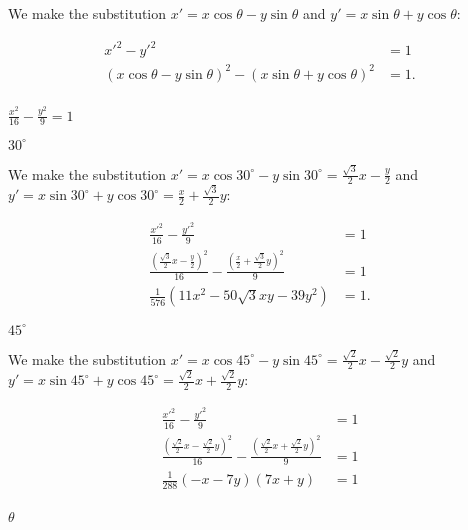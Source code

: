 \documentclass[../gatm_answers.tex]{subfiles}
\begin{document}
We make the substitution $x'=x \cos \theta - y\sin \theta$ and $y'=x\sin \theta + y\cos \theta$:

\begin{align*}
x'^2-y'^2&=1 \\
(x \cos \theta - y\sin \theta)^2 - (x\sin \theta + y\cos \theta)^2 &= 1. \\
\end{align*}

\begin{inner_problem}
\item $\frac{x^2}{16}-\frac{y^2}{9}=1$
\end{inner_problem}

\begin{iinner_problem}[start=1]
\item $30^\circ$
\end{iinner_problem}

We make the substitution $x'=x \cos 30^\circ - y\sin 30^\circ=\frac{\sqrt{3}}{2}x-\frac{y}{2}$ and $y'=x\sin 30^\circ + y\cos 30^\circ=\frac{x}{2}+\frac{\sqrt{3}}{2}y$:

\begin{align*}
\frac{x'^2}{16}-\frac{y'^2}{9} &= 1 \\
\frac{\left(\frac{\sqrt{3}}{2}x-\frac{y}{2}\right)^2}{16} - \frac{\left(\frac{x}{2}+\frac{\sqrt{3}}{2}y\right)^2}{9} &= 1 \\
\frac{1}{576} (11 x^2 - 50 \sqrt{3} x y - 39 y^2) &= 1.
\end{align*}

\begin{iinner_problem}
\item $45^\circ$
\end{iinner_problem}

We make the substitution $x'=x \cos 45^\circ - y\sin 45^\circ=\frac{\sqrt{2}}{2}x-\frac{\sqrt{2}}{2}y$ and $y'=x\sin 45^\circ + y\cos 45^\circ=\frac{\sqrt{2}}{2}x+\frac{\sqrt{2}}{2}y$:

\begin{align*}
\frac{x'^2}{16}-\frac{y'^2}{9} &= 1 \\
\frac{\left(\frac{\sqrt{2}}{2}x-\frac{\sqrt{2}}{2}y\right)^2}{16} - \frac{\left(\frac{\sqrt{2}}{2}x+\frac{\sqrt{2}}{2}y\right)^2}{9} &= 1 \\
\frac{1}{288} (-x - 7 y) (7 x + y) &= 1 \\
\end{align*}

\begin{iinner_problem}
\item $\theta$
\end{iinner_problem}
\end{document}
